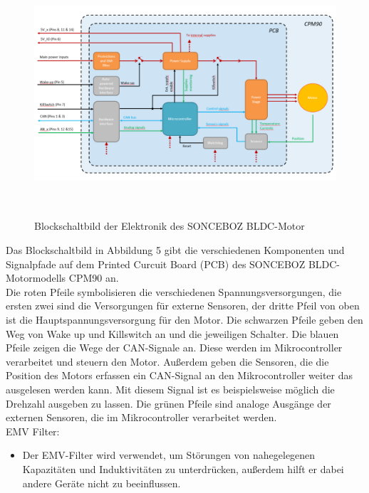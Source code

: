 \begin{figure}[h]
        \begin{center}
            \includegraphics[width=15.76cm, height= 9.15cm]{images/Abbildung 5.png}
            \caption{Blockschaltbild der Elektronik des SONCEBOZ BLDC-Motor \cite{SONCEBOZ}}
            \label{Blockschaltbild BLDC}
            \end{center}
    \end{figure}

Das Blockschaltbild in Abbildung 5 gibt die verschiedenen Komponenten und Signalpfade auf dem Printed Curcuit Board (PCB) des SONCEBOZ BLDC-Motormodells CPM90 an. \\

Die roten Pfeile symbolisieren die verschiedenen Spannungsversorgungen, die ersten zwei sind die Versorgungen für externe Sensoren, der dritte Pfeil von oben ist die Hauptspannungsversorgung für den Motor. 
Die schwarzen Pfeile geben den Weg von Wake up und Killswitch an und die jeweiligen Schalter. 
Die blauen Pfeile zeigen die Wege der CAN-Signale an. Diese werden im Mikrocontroller verarbeitet und steuern den Motor. Au{\ss}erdem geben die Sensoren, die die Position des Motors erfassen ein CAN-Signal an den Mikrocontroller weiter das ausgelesen werden kann. Mit diesem Signal ist es beispielsweise möglich die Drehzahl ausgeben zu lassen.
Die grünen Pfeile sind analoge Ausgänge der externen Sensoren, die im Mikrocontroller verarbeitet werden. \cite{SONCEBOZ}\\


EMV Filter:
\begin{itemize}
    \item Der EMV-Filter wird verwendet, um Störungen von nahegelegenen Kapazitäten und Induktivitäten zu unterdrücken, au{\ss}erdem hilft er dabei andere Geräte nicht zu beeinflussen. \cite{SONCEBOZ}
\end{itemize}

